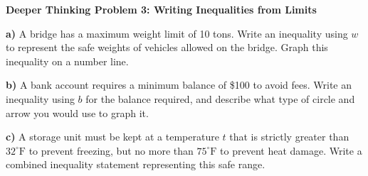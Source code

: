 \documentclass[12pt, letterpaper, fleqn]{article}
\begin{document}
\begin{tcolorbox}[colback=white, colframe=black, boxrule=1pt, arc=4mm, left=6mm, right=6mm, top=5mm, bottom=5mm]
\textbf{Deeper Thinking Problem 3: Writing Inequalities from Limits}

\medskip

\noindent
\textbf{a)} A bridge has a maximum weight limit of 10 tons. Write an inequality using $w$ to represent the safe weights of vehicles allowed on the bridge. Graph this inequality on a number line.

\vspace{5cm}

\noindent
\textbf{b)} A bank account requires a minimum balance of \$100 to avoid fees. Write an inequality using $b$ for the balance required, and describe what type of circle and arrow you would use to graph it.

\vspace{5cm}

\noindent
\textbf{c)} A storage unit must be kept at a temperature $t$ that is strictly greater than $32^\circ\text{F}$ to prevent freezing, but no more than $75^\circ\text{F}$ to prevent heat damage. Write a combined inequality statement representing this safe range.

\vspace{5cm}
\end{tcolorbox}
\newpage
\end{document}
